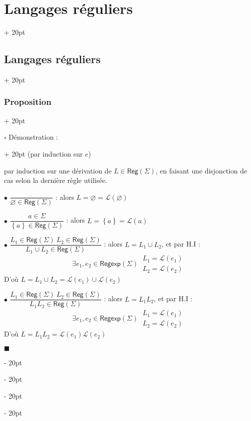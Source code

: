 \documentclass[a4paper, 12pt, twoside]{article}
\newcommand{\set}[1]{\left\{ #1 \right\}}
\newcommand{\ind}[1][20pt]{\advance\leftskip + #1}
\newcommand{\deind}[1][20pt]{\advance\leftskip - #1}
\newenvironment{indt}[2][20pt]{#2 \par \ind[#1]}{\par \deind} %
\newenvironment{proof}[1][{Démonstration :}]{\begin{indt}{$\square$ #1}}{$\blacksquare$ \end{indt}}
\newcommand{\Reg}{\mathsf{Reg}}
\newcommand{\Regexp}{\mathsf{Regexp}}
\begin{document}
\begin{indt}{\section{Langages réguliers}}
\begin{indt}{\subsection{Langages réguliers}}
\begin{indt}{\subsubsection{Proposition}}
                \vspace{12pt}
                
                \begin{proof}
                    \boxed{\Leftarrow} 
                    (par induction sur $e$)

                    \vspace{12pt}
                    
                    \boxed{\Rightarrow} par induction sur une dérivation de $L \in \Reg(\Sigma)$, en faisant une disjonction de cas selon la dernière règle utilisée.

                    \vspace{6pt}
                    
                    $\bullet$ $\dfrac{}{\varnothing \in \Reg(\Sigma)}$ : alors $L = \varnothing = \mathcal L(\varnothing)$

                    \vspace{6pt}
                    
                    $\bullet$ $\dfrac{a \in \Sigma}{\set a \in \Reg(\Sigma)}$ : alors $L = \set a = \mathcal L(a)$

                    \vspace{6pt}
                    
                    $\bullet$ $\dfrac{L_1 \in \Reg(\Sigma)\ L_2 \in \Reg(\Sigma)}{L_1 \cup L_2 \in \Reg(\Sigma)}$ : alors $L = L_1 \cup L_2$, et par H.I :
                    \[
                        \exists e_1, e_2 \in \Regexp(\Sigma)\
                        \begin{array}{|l}
                            L_1 = \mathcal L(e_1)
                            \\
                            L_2 = \mathcal L(e_2)
                        \end{array}
                    \]
                    D'où $L = L_1 \cup L_2 = \mathcal L(e_1) \cup \mathcal L(e_2)$

                    \vspace{6pt}
                    
                    $\bullet$ $\dfrac{L_1 \in \Reg(\Sigma)\ L_2 \in \Reg(\Sigma)}{L_1 L_2 \in \Reg(\Sigma)}$ : alors $L = L_1 L_2$, et par H.I :
                    \[
                        \exists e_1, e_2 \in \Regexp(\Sigma)\
                        \begin{array}{|l}
                            L_1 = \mathcal L(e_1)
                            \\
                            L_2 = \mathcal L(e_2)
                        \end{array}
                    \]
                    D'où $L = L_1 L_2 = \mathcal L(e_1) \mathcal L(e_2)$


\end{proof}
\end{indt}
\end{indt}
\end{indt}
\end{document}
